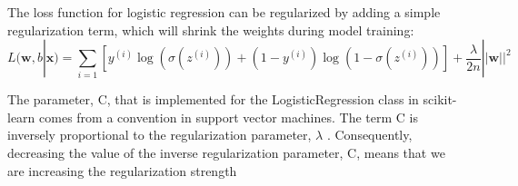 The loss function for logistic regression can be regularized by adding a simple regularization term, which will shrink the weights during model training:
\begin{equation}
    L(\textbf{w}, b|\textbf{x})  =\sum_{i=1}\left[y^{(i)}\log(\sigma(z^{(i)}))+(1-y^{(i)})\log(1-\sigma(z^{(i)}))\right]+\frac{\lambda}{2n}||\textbf{w}||^2
\end{equation}

The parameter, \textsf{C}, that is implemented for the LogisticRegression class in scikit-learn comes from a convention in support vector machines. The term \textsf{C} is inversely proportional to the regularization parameter, $\lambda$ . Consequently, decreasing the value of the inverse regularization parameter, \textsf{C}, means that we are increasing the regularization strength